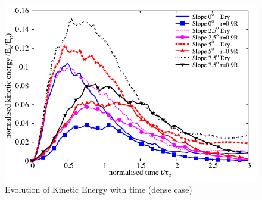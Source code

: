 \begin{figure}
\centering
\includegraphics[width=0.97\columnwidth]{KE_dense}
\caption{Evolution of Kinetic Energy with time (dense case)}
\label{fig:KE_dense}
\end{figure}


